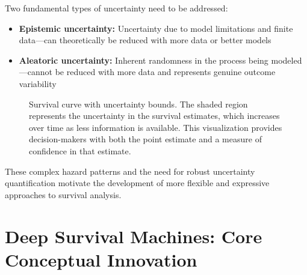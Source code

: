 Two fundamental types of uncertainty need to be addressed:
\begin{itemize}
    \item \textbf{Epistemic uncertainty:} Uncertainty due to model limitations and finite data—can theoretically be reduced with more data or better models
    \item \textbf{Aleatoric uncertainty:} Inherent randomness in the process being modeled—cannot be reduced with more data and represents genuine outcome variability
\end{itemize}

\begin{figure}[htbp]
    \centering
    \caption{Survival curve with uncertainty bounds. The shaded region represents the uncertainty in the survival estimates, which increases over time as less information is available. This visualization provides decision-makers with both the point estimate and a measure of confidence in that estimate.}
    \label{fig:survival-uncertainty}
\end{figure}

These complex hazard patterns and the need for robust uncertainty quantification motivate the development of more flexible and expressive approaches to survival analysis.

\section{Deep Survival Machines: Core Conceptual Innovation}


